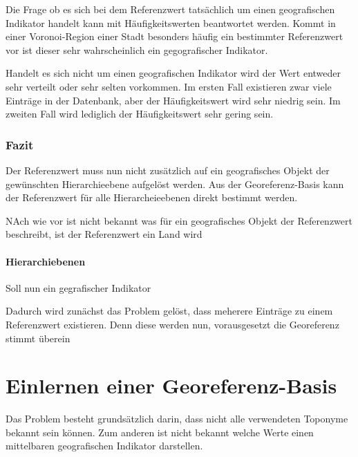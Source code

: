 			Die Frage ob es sich bei dem Referenzwert tatsächlich um einen geografischen Indikator handelt kann mit Häufigkeitswerten beantwortet werden.
			Kommt in einer Voronoi-Region einer Stadt besonders häufig ein bestimmter Referenzwert vor ist dieser sehr wahrscheinlich ein gegografischer Indikator.

			Handelt es sich nicht um einen geografischen Indikator wird der Wert entweder sehr verteilt oder sehr selten vorkommen.
			Im ersten Fall existieren zwar viele Einträge in der Datenbank, aber der Häufigkeitswert wird sehr niedrig sein.
			Im zweiten Fall wird lediglich der Häufigkeitswert sehr gering sein.




		
				
			\subsubsection{Fazit} 

				Der Referenzwert muss nun nicht zusätzlich auf ein geografisches Objekt der gewünschten Hierarchieebene aufgelöst werden.
				Aus der Georeferenz-Basis kann der Referenzwert für alle Hierarcheieebenen direkt bestimmt werden.

				NAch wie vor ist nicht bekannt was für ein geografisches Objekt der Referenzwert beschreibt, ist der Referenzwert ein Land wird 



		
			\paragraph{Hierarchiebenen}   


			Soll nun ein gegrafischer Indikator



			Dadurch wird zunächst das Problem gelöst, dass meherere Einträge zu einem Referenzwert existieren.
			Denn diese werden nun, vorausgesetzt die Georeferenz stimmt überein 






			





	\section{Einlernen einer Georeferenz-Basis}

			Das Problem besteht grundsätzlich darin, dass nicht alle verwendeten Toponyme bekannt sein können. 
			Zum anderen ist nicht bekannt welche Werte einen mittelbaren geografischen Indikator darstellen.





